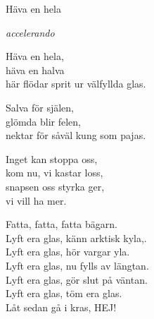 \begin{song}{Häva en hela}
	
	
	
	\emph{accelerando}
	
	\begin{repetition}
		Häva en hela,\\
		häva en halva\\
		här flödar sprit ur välfyllda glas.

		Salva för själen,\\
		glömda blir felen,\\
		nektar för såväl kung som pajas.

		\begin{repetition}
			Inget kan stoppa oss,\\
			kom nu, vi kastar loss,\\
			snapsen oss styrka ger,\\
			vi vill ha mer.
		\end{repetition}

		Fatta, fatta, fatta bägarn.\\
		Lyft era glas, känn arktisk kyla,.\\
		Lyft era glas, hör vargar yla.\\
		Lyft era glas, nu fylls av längtan.\\
		Lyft era glas, gör slut på väntan.\\
		Lyft era glas, töm era glas.\\
		Låt sedan gå i kras, HEJ!
	\end{repetition}
	
\end{song}
